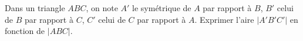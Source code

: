 Dans un triangle $ABC$, on note $A'$ le symétrique de $A$ par rapport à $B$, $B'$ celui de $B$ par rapport à $C$, $C'$ celui de $C$ par rapport à $A$. Exprimer l'aire $|A'B'C'|$ en fonction de $|ABC|$.
